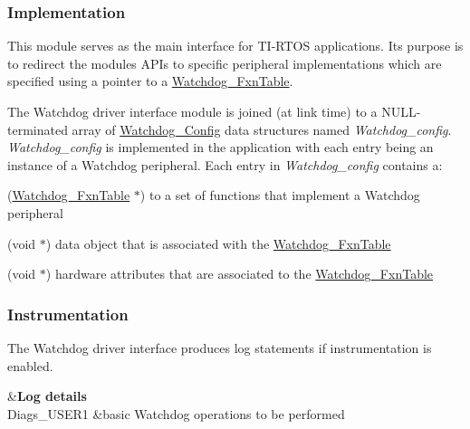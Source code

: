 \subsubsection*{Implementation}

This module serves as the main interface for T\+I-\/\+R\+T\+O\+S applications. Its purpose is to redirect the module\textquotesingle{}s A\+P\+Is to specific peripheral implementations which are specified using a pointer to a \hyperlink{struct_watchdog___fxn_table}{Watchdog\+\_\+\+Fxn\+Table}.

The Watchdog driver interface module is joined (at link time) to a N\+U\+L\+L-\/terminated array of \hyperlink{struct_watchdog___config}{Watchdog\+\_\+\+Config} data structures named {\itshape Watchdog\+\_\+config}. {\itshape Watchdog\+\_\+config} is implemented in the application with each entry being an instance of a Watchdog peripheral. Each entry in {\itshape Watchdog\+\_\+config} contains a\+:
\begin{DoxyItemize}
\item (\hyperlink{struct_watchdog___fxn_table}{Watchdog\+\_\+\+Fxn\+Table} $\ast$) to a set of functions that implement a Watchdog peripheral
\item (void $\ast$) data object that is associated with the \hyperlink{struct_watchdog___fxn_table}{Watchdog\+\_\+\+Fxn\+Table}
\item (void $\ast$) hardware attributes that are associated to the \hyperlink{struct_watchdog___fxn_table}{Watchdog\+\_\+\+Fxn\+Table}
\end{DoxyItemize}

\subsubsection*{Instrumentation}

The Watchdog driver interface produces log statements if instrumentation is enabled.

\begin{TabularC}{2}
\hline
{}&{\bf Log details  }\\
Diags\+\_\+\+U\+S\+E\+R1 &basic Watchdog operations to be performed \\
\end{TabularC}


